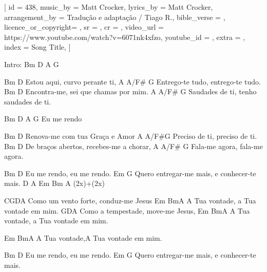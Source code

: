 [
    id                  = {438},
    music_by            = {Matt Crocker}, %
    lyrics_by           = {Matt Crocker}, %
    arrangement_by      = {Tradução e adaptação / Tiago R.}, %
    bible_verse         = {},
    licence_or_copyright= {},
    sr                  = {},
    cr                  = {},
    video_url           = {https://www.youtube.com/watch?v=6071nk4xfzo}, %
    youtube_id          = {}, %
    extra               = {},
    index               = {Song Title},
]

\beginverse
Intro: Bm D A G

Bm D
Estou aqui, curvo perante ti,
A A/F# G
Entrego-te tudo, entrego-te tudo.
Bm D
Encontra-me, sei que chamas por mim.
A A/F# G
Saudades de ti, tenho saudades de ti.

Bm D A G
Eu me rendo

\endverse

\beginverse

Bm D
Renova-me com tua Graça e Amor
A A/F#G
Preciso de ti, preciso de ti.
Bm D
De braços abertos, recebes-me a chorar,
A A/F# G
Fala-me agora, fala-me agora.

\endverse

\beginverse

Bm D
Eu me rendo, eu me rendo.
Em G
Quero entregar-me mais, e conhecer-te mais.
D A Em Bm A
(2x)+(2x)

\endverse

\beginverse

CGDA
Como um vento forte, conduz-me Jesus
Em BmA
A Tua vontade, a Tua vontade em mim.
GDA
Como a tempestade, move-me Jesus,
Em BmA
A Tua vontade, a Tua vontade em mim.

Em BmA
A Tua vontade,A Tua vontade em mim.

Bm D
Eu me rendo, eu me rendo.
Em G
Quero entregar-me mais, e conhecer-te mais.

\endverse

\endsong
